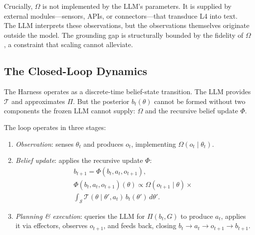 Crucially, \(\Omega\) is not implemented by the LLM's parameters. It is supplied by external modules---sensors, APIs, or connectors---that transduce L4 into text. The LLM interprets these observations, but the observations themselves originate outside the model. The grounding gap is structurally bounded by the fidelity of \(\Omega\), a constraint that scaling cannot alleviate.

\subsection{The Closed-Loop Dynamics}

The Harness operates as a discrete-time belief-state transition. The LLM provides \(\mathcal{T}\) and approximates \(\Pi\). But the posterior \(b_t(\theta)\) cannot be formed without two components the frozen LLM cannot supply: \(\Omega\) and the recursive belief update \(\Phi\).

The loop operates in three stages:

\begin{enumerate}
\item \emph{Observation}: senses \(\theta_t\) and produces \(o_t\), implementing \(\Omega(o_t \mid \theta_t)\).

\item \emph{Belief update}: applies the recursive update \(\Phi\):
\begin{multline}
b_{t+1} = \Phi(b_t, a_t, o_{t+1}), \\[2pt]
\Phi(b_t, a_t, o_{t+1})(\theta) \propto
\Omega(o_{t+1} \mid \theta) \times \\
\int_{\mathcal{S}} \mathcal{T}(\theta \mid \theta', a_t) \, b_t(\theta') \, d\theta'.
\end{multline}

\item \emph{Planning \& execution}: queries the LLM for \(\Pi(b_t, G)\) to produce \(a_t\), applies it via effectors, observes \(o_{t+1}\), and feeds back, closing \(b_t \to a_t \to o_{t+1} \to b_{t+1}\).
\end{enumerate}

